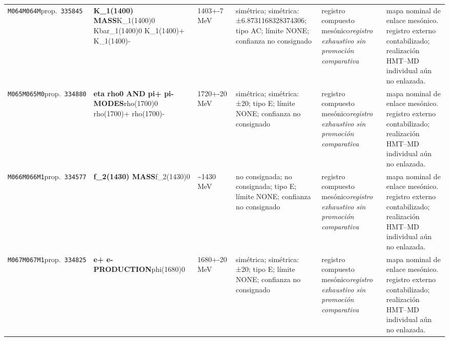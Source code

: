 \begin{landscape}
\begin{longtable}{L{1.85cm}L{4.45cm}L{2.35cm}L{4.05cm}L{3.35cm}L{7.15cm}}
\texttt{M064}\newline \texttt{M064M}\newline prop.\ \texttt{335845} & \textbf{K\_\allowbreak{}1(1400) MASS}\newline K\_\allowbreak{}1(1400)0 \textbar{}\allowbreak{} Kbar\_\allowbreak{}1(1400)0 \textbar{}\allowbreak{} K\_\allowbreak{}1(1400)+ \textbar{}\allowbreak{} K\_\allowbreak{}1(1400)- & 1403+-7\,MeV & simétrica; simétrica: ±6.8731168328374306; tipo AC; límite NONE; confianza no consignado & registro compuesto mesónico\newline \emph{registro exhaustivo sin promoción comparativa} & mapa nominal de enlace mesónico. registro externo contabilizado; realización HMT--MD individual aún no enlazada. \\
\texttt{M065}\newline \texttt{M065M0}\newline prop.\ \texttt{334880} & \textbf{eta rho0 AND pi+ pi- MODES}\newline rho(1700)0 \textbar{}\allowbreak{} rho(1700)+ \textbar{}\allowbreak{} rho(1700)- & 1720+-20\,MeV & simétrica; simétrica: ±20; tipo E; límite NONE; confianza no consignado & registro compuesto mesónico\newline \emph{registro exhaustivo sin promoción comparativa} & mapa nominal de enlace mesónico. registro externo contabilizado; realización HMT--MD individual aún no enlazada. \\
\texttt{M066}\newline \texttt{M066M1}\newline prop.\ \texttt{334577} & \textbf{f\_\allowbreak{}2(1430) MASS}\newline f\_\allowbreak{}2(1430)0 & \textasciitilde{}1430\,MeV & no consignada; no consignada; tipo E; límite NONE; confianza no consignado & registro compuesto mesónico\newline \emph{registro exhaustivo sin promoción comparativa} & mapa nominal de enlace mesónico. registro externo contabilizado; realización HMT--MD individual aún no enlazada. \\
\texttt{M067}\newline \texttt{M067M1}\newline prop.\ \texttt{334825} & \textbf{e+ e- PRODUCTION}\newline phi(1680)0 & 1680+-20\,MeV & simétrica; simétrica: ±20; tipo E; límite NONE; confianza no consignado & registro compuesto mesónico\newline \emph{registro exhaustivo sin promoción comparativa} & mapa nominal de enlace mesónico. registro externo contabilizado; realización HMT--MD individual aún no enlazada. \\

\end{longtable}
\end{landscape}
